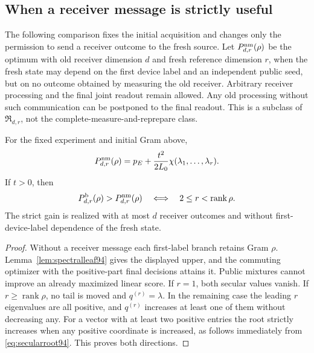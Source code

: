 \subsection{When a receiver message is strictly useful}
The following comparison fixes the initial acquisition and changes
only the permission to send a receiver outcome to the fresh source.
Let $P_{d,r}^{\rm nm}(\rho)$ be the optimum with old receiver dimension
$d$ and fresh reference dimension $r$, when the fresh state may depend
on the first device label and an independent public seed, but on no
outcome obtained by measuring the old receiver.  Arbitrary receiver
processing and the final joint readout remain allowed.  Any old
processing without such communication can be postponed to the final
readout.  This is a subclass of $\mathfrak R_{d,r}$, not the
complete-measure-and-reprepare class.

\begin{corollary}\label{cor:messagevalue94}
For the fixed experiment and initial Gram above,
\begin{equation}\label{eq:nomessage94}
 P_{d,r}^{\rm nm}(\rho)
          =p_E+\frac{t^2}{2L_0}\chi(\lambda_1,\ldots,\lambda_r).
\end{equation}
If $t>0$, then
\begin{equation}\label{eq:messagestrict94}
 P_{d,r}^{\rm b}(\rho)>P_{d,r}^{\rm nm}(\rho)
                 \quad\Longleftrightarrow\quad
                      2\le r<\operatorname{rank}\rho.
\end{equation}
The strict gain is realized with at most $d$ receiver outcomes and
without first-device-label dependence of the fresh state.
\end{corollary}
\begin{proof}
Without a receiver message each first-label branch retains Gram
$\rho$.  Lemma~\ref{lem:spectralleaf94} gives the displayed upper,
and the commuting optimizer with the positive-part final decisions
attains it.  Public mixtures cannot improve an already maximized
linear score.  If $r=1$, both secular values vanish.  If
$r\ge\operatorname{rank}\rho$, no tail is moved and $q^{(r)}=\lambda$.
In the remaining case the leading $r$ eigenvalues are all positive,
and $q^{(r)}$ increases at least one of them without decreasing any.
For a vector with at least two positive entries the root strictly
increases when any positive coordinate is increased, as follows
immediately from \eqref{eq:secularroot94}.  This proves both directions.
\end{proof}

